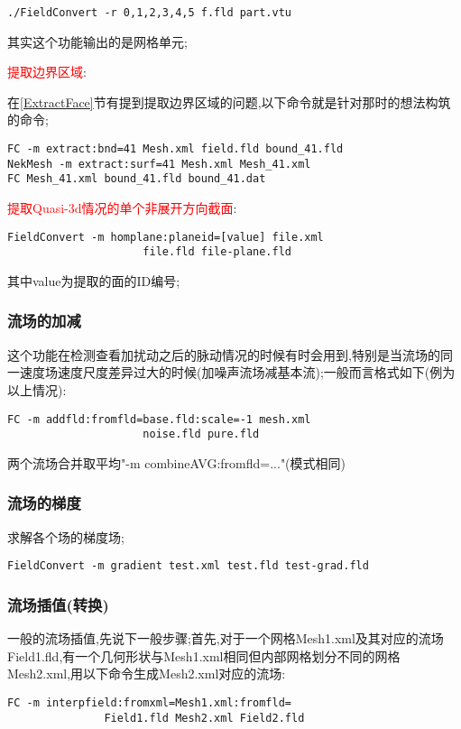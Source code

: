 \begin{lstlisting}[frame=single]
	./FieldConvert -r 0,1,2,3,4,5 f.fld part.vtu
\end{lstlisting}
\par
其实这个功能输出的是网格单元;

\textcolor{red}{提取边界区域}:\par
在\ref{ExtractFace}节有提到提取边界区域的问题,以下命令就是针对那时的想法构筑的命令;\par
\begin{lstlisting}[frame=single]
FC -m extract:bnd=41 Mesh.xml field.fld bound_41.fld
NekMesh -m extract:surf=41 Mesh.xml Mesh_41.xml
FC Mesh_41.xml bound_41.fld bound_41.dat
\end{lstlisting}

\textcolor{red}{提取Quasi-3d情况的单个非展开方向截面}:\par
\begin{lstlisting}[frame=single]
FieldConvert -m homplane:planeid=[value] file.xml 
				     file.fld file-plane.fld
\end{lstlisting}
\par
其中value为提取的面的ID编号;


\subsubsection{流场的加减}
这个功能在检测查看加扰动之后的脉动情况的时候有时会用到,特别是当流场的同一速度场速度尺度差异过大的时候(加噪声流场减基本流);一般而言格式如下(例为以上情况):\par

\begin{lstlisting}[frame=single]
FC -m addfld:fromfld=base.fld:scale=-1 mesh.xml
					 noise.fld pure.fld
\end{lstlisting}
两个流场合并取平均"-m combineAVG:fromfld=..."(模式相同)


\subsubsection{流场的梯度}
求解各个场的梯度场;\par
\begin{lstlisting}[frame=single]
FieldConvert -m gradient test.xml test.fld test-grad.fld
\end{lstlisting}


\subsubsection{流场插值(转换)}
一般的流场插值,先说下一般步骤;首先,对于一个网格Mesh1.xml及其对应的流场Field1.fld,有一个几何形状与Mesh1.xml相同但内部网格划分不同的网格Mesh2.xml,用以下命令生成Mesh2.xml对应的流场:\par
\begin{lstlisting}[frame=single]
FC -m interpfield:fromxml=Mesh1.xml:fromfld=
			   Field1.fld Mesh2.xml Field2.fld
\end{lstlisting}

